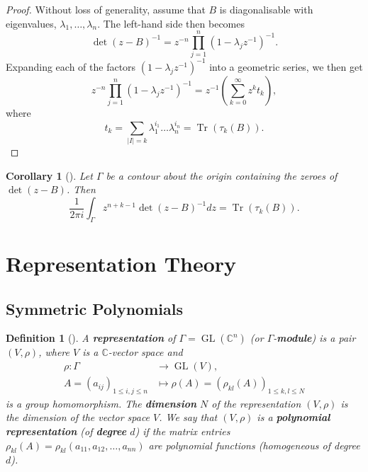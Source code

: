 \documentclass{article}
\newtheorem{corollary}[theorem]{Corollary}
\newtheorem{defn}[theorem]{Definition\rm}
\newcommand{\lra}{\longrightarrow}
\newcommand{\CC}{\mathbb{C}}
\newcommand{\pbrackets}[1]{\left( #1 \right)}
\DeclareMathOperator{\Tr}{Tr}
\DeclareMathOperator{\GL}{GL}
\begin{document}
	\begin{proof}
		Without loss of generality, assume that $B$ is diagonalisable with eigenvalues, $\lambda_{1}, \ldots, \lambda_{n}$. The left-hand side then becomes
		\begin{equation*}
			\det(z - B)^{-1} = z^{-n}\prod\limits_{j = 1}^{n}(1 - \lambda_{j}z^{-1})^{-1}.
		\end{equation*}
		Expanding each of the factors $(1 - \lambda_{j}z^{-1})^{-1}$ into a geometric series, we then get
		\begin{equation*}
			z^{-n}\prod\limits_{j = 1}^{n}(1 - \lambda_{j}z^{-1})^{-1} = z^{-1}\left( \sum_{k = 0}^{\infty} z^{k}t_{k} \right),
		\end{equation*}
		where
		\begin{equation*}
			t_{k} = \sum_{|I| = k} \lambda_{1}^{i_{1}}\ldots\lambda_{n}^{i_{n}} = \Tr\pbrackets{\tau_{k}(B)}.
		\end{equation*}
	\end{proof}
	
	\begin{corollary}[\cite{CanasdaSilva1996}]\label{residue:4}
		Let $\Gamma$ be a contour about the origin containing the zeroes of $\det(z - B)$. Then
		\begin{equation*}
			\frac{1}{2\pi i} \int_{\Gamma} z^{n + k -1} \det(z - B)^{-1} dz = \Tr\pbrackets{\tau_{k}(B)}.
		\end{equation*}
	\end{corollary}

	\section{Representation Theory}
	
	\subsection{Symmetric Polynomials}
	
		\begin{defn}[\cite{Sturmfels2008}]
		A \textbf{representation} of $\Gamma = \GL(\CC^{n})$ (or $\Gamma$-\textbf{module}) is a pair $(V, \rho)$, where $V$ is a $\CC$-vector space and
		\begin{equation*}
			\begin{split}
				\rho : \Gamma &\lra \GL(V), \\
				A = (a_{ij})_{1 \leq i,j \leq n} &\longmapsto \rho(A) = \pbrackets{\rho_{kl}(A)}_{1 \leq k, l \leq N}
			\end{split}
		\end{equation*}
		is a group homomorphism. The \textbf{dimension} $N$ of the representation $(V, \rho)$ is the dimension of the vector space $V$. We say that $(V, \rho)$ is a \textbf{polynomial representation} (of \textbf{degree} $d$) if the matrix entries $\rho_{kl}(A) = \rho_{kl}(a_{11}, a_{12}, \ldots, a_{nn})$ are polynomial functions (homogeneous of degree $d$).
	\end{defn}
	
\end{document}
